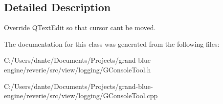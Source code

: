 \subsection{Detailed Description}
Override Q\+Text\+Edit so that cursor can\textquotesingle{}t be moved. 

The documentation for this class was generated from the following files\+:\begin{DoxyCompactItemize}
\item 
C\+:/\+Users/dante/\+Documents/\+Projects/grand-\/blue-\/engine/reverie/src/view/logging/G\+Console\+Tool.\+h\item 
C\+:/\+Users/dante/\+Documents/\+Projects/grand-\/blue-\/engine/reverie/src/view/logging/G\+Console\+Tool.\+cpp\end{DoxyCompactItemize}
